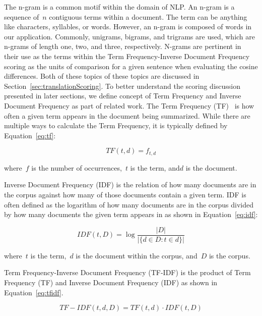 \documentclass{article}[10]
\begin{document}
The n-gram is a common motif within the domain of NLP. An n-gram is a sequence of~\(n\) contiguous terms within a document. The term can be anything like characters, syllables, or words. However, an n-gram is composed of words in our application. Commonly, unigrams, bigrams, and trigrams are used, which are n-grams of length one, two, and three, respectively. N-grams are pertinent in their use as the terms within the Term Frequency-Inverse Document Frequency scoring as the units of comparison for a given sentence when evaluating the cosine differences. Both of these topics of these topics are discussed in Section~\ref{sec:translationScoring}. To better understand the scoring discussion presented in later sections, we define concept of Term Frequency and Inverse Document Frequency as part of related work. The Term Frequency (TF)~\cite{Leskovec} is how often a given term appears in the document being summarized. While there are multiple ways to calculate the Term Frequency, it is typically defined by Equation~\eqref{eq:tf}:

\begin{equation}
  TF(t, d) = f_{t, d} \label{eq:tf}
\end{equation}

where~\(f\) is the number of occurrences,~\(t\) is the term, and\(d\) is the document.

Inverse Document Frequency (IDF) is the relation of how many documents are in the corpus against how many of those documents contain a given term. IDF is often defined as the logarithm of how many documents are in the corpus divided by how many documents the given term appears in as shown in Equation~\eqref{eq:idf}:

\begin{equation}
  IDF(t, D) = \log\frac{|D|}{|\{d \in D : t \in d\}|} \label{eq:idf}
\end{equation}

where~\(t\) is the term,~\(d\) is the document within the corpus, and~\(D\) is the corpus.

Term Frequency-Inverse Document Frequency (TF-IDF) is the product of Term Frequency (TF) and Inverse Document Frequency (IDF) as shown in Equation~\eqref{eq:tfidf}.

\begin{equation}
  TF-IDF(t, d, D) = TF(t, d) \cdot IDF(t, D) \label{eq:tfidf}
\end{equation}
\end{document}
